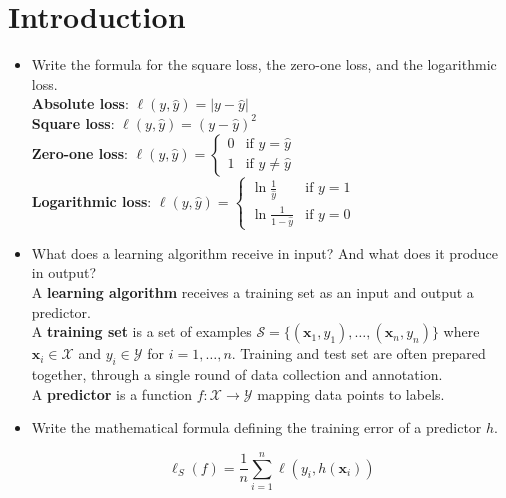 \newpage
\section{Introduction}

\begin{itemize}
    \item Write the formula for the square loss, the zero-one loss, and the logarithmic loss.\\

        \textbf{Absolute loss}: $\ell(y, \hat{y}) = |y-\hat{y}|$\\
        \textbf{Square loss}: $\ell(y, \hat{y}) = (y-\hat{y})^2$\\
        \textbf{Zero-one loss}: $\ell(y, \hat{y}) = \begin{cases} 
            0 & \text{if } y = \hat{y}\\ 
            1 & \text{if } y \neq \hat{y}
        \end{cases}$\\
        \textbf{Logarithmic loss}: $\ell(y, \hat{y}) = \begin{cases} 
            \ln\frac{1}{\hat{y}} & \text{if } y = 1\\ 
            \ln\frac{1}{1-\hat{y}} & \text{if } y = 0 
        \end{cases}$\\

    \item What does a learning algorithm receive in input? And what does it produce in output?\\

        A \textbf{learning algorithm} receives a training set as an input and output a predictor.\\ A \textbf{training set} is a set of examples $\mathcal{S} = \{(\boldsymbol{x}_1, y_1), \dots, (\boldsymbol{x}_n, y_n)\}$ where $\boldsymbol{x}_i \in \mathcal{X}$ and $y_i \in \mathcal{Y}$ for $i = 1, \dots, n$. Training and test set are often prepared together, through a single round of data collection and annotation.\\ A \textbf{predictor} is a function $f: \mathcal{X} \rightarrow \mathcal{Y}$ mapping data points to labels.\\
    
    \item Write the mathematical formula defining the training error of a predictor $h$.

        $$\ell_{S}(f) = \frac{1}{n} \sum_{i=1}^n \ell(y_i, h(\boldsymbol{x}_i))$$


\end{itemize}
